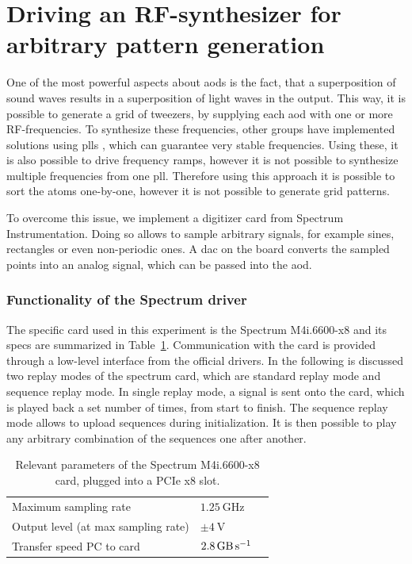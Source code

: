 \section{Driving an RF-synthesizer for arbitrary pattern generation}

One of the most powerful aspects about \acp{aod} is the fact, that a superposition of sound waves results in a superposition of light waves in the output. This way, it is possible to generate a grid of tweezers, by supplying each \ac{aod} with one or more RF-frequencies. To synthesize these frequencies, other groups have implemented solutions using \acp{pll} , which can guarantee very stable frequencies. Using these, it is also possible to drive frequency ramps, however it is not possible to synthesize multiple frequencies from one \ac{pll}. Therefore using this approach it is possible to sort the atoms one-by-one, however it is not possible to generate grid patterns.

To overcome this issue, we implement a digitizer card from Spectrum Instrumentation. Doing so allows to sample arbitrary signals, for example sines, rectangles or even non-periodic ones. A \ac{dac} on the board converts the sampled points into an analog signal, which can be passed into the \ac{aod}.

\subsubsection*{Functionality of the Spectrum driver}

The specific card used in this experiment is the Spectrum M4i.6600-x8 and its specs are summarized in Table~\ref{tbl:spec_m4i}. Communication with the card is provided through a low-level interface from the official drivers. In the following is discussed two replay modes of the spectrum card, which are standard replay mode and sequence replay mode. In single replay mode, a signal is sent onto the card, which is played back a set number of times, from start to finish. The sequence replay mode allows to upload sequences during initialization. It is then possible to play any arbitrary combination of the sequences one after another.

\begin{table}[bt]
\label{tbl:spec_m4i}
\centering
\begin{tabular}{l|l|l}
	\hline \hline
	Maximum sampling rate & $\SI{1.25}{\giga\hertz}$ \\
	Output level (at max sampling rate) & $\pm \SI{4}{\volt}$ \\
	Transfer speed PC to card & $\SI{2.8}{\giga\byte\per\second}$ \\
	\hline \hline
\end{tabular}
\caption{Relevant parameters of the Spectrum M4i.6600-x8 card, plugged into a PCIe x8 slot.}
\end{table}

